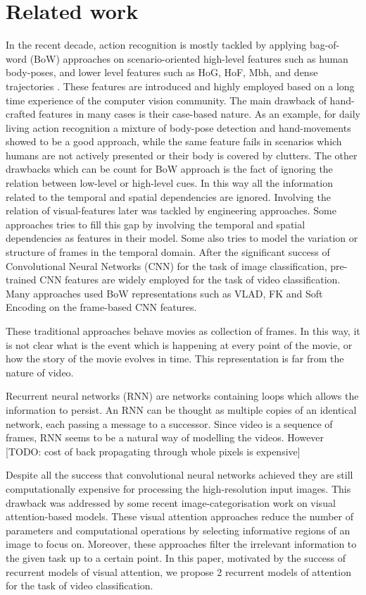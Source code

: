 \documentclass{article} %
\begin{document}
\section{Related work}
In the recent decade, action recognition is mostly tackled by applying bag-of-word (BoW) approaches on scenario-oriented high-level features such as human body-poses, and lower level features such as HoG, HoF, Mbh, and dense trajectories . These features are introduced and highly employed based on a long time experience of the computer vision community. The main drawback of hand-crafted features in many cases is their case-based nature. As an example, for daily living action recognition a mixture of body-pose detection and hand-movements showed to be a good approach, while the same feature fails in scenarios which humans are not actively presented or their body is covered by clutters. The other drawbacks which can be count for BoW approach is the fact of ignoring the relation between low-level or high-level cues. In this way all the information related to the temporal and spatial dependencies are ignored. Involving the relation of visual-features later was tackled by engineering approaches. Some approaches tries to fill this gap by involving the temporal and spatial dependencies as features in their model. Some also tries to model the variation or structure of frames in the temporal domain. 
After the significant success of Convolutional Neural Networks (CNN) for the task of image classification, pre-trained CNN features are widely employed for the task of video classification. Many approaches used BoW representations such as VLAD, FK and Soft Encoding on the frame-based CNN features.

These traditional approaches behave movies as collection of frames. In this way, it is not clear what is the event which is happening at every point of the movie, or how the story of the movie evolves in time. This representation is far from the nature of video.

Recurrent neural networks (RNN) are networks containing loops which allows the information to persist. An RNN can be thought as multiple copies of an identical network, each passing a message to a successor. Since video is a sequence of frames, RNN seems to be a natural way of modelling the videos. However [TODO: cost of back propagating through whole pixels is expensive]

Despite all the success that convolutional neural networks achieved they are still computationally expensive for processing the high-resolution input images. This drawback was addressed by some recent image-categorisation work on visual attention-based models. These visual attention approaches reduce the number of parameters and computational operations by selecting informative regions of an image to focus on. Moreover, these approaches filter the irrelevant information to the given task up to a certain point. In this paper, motivated by the success of recurrent models of visual attention, we propose 2 recurrent models of attention for the task of video classification. 
\end{document}
